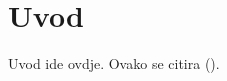 \chapter{Uvod}
\label{sec:structure}
 
Uvod ide ovdje. Ovako se citira (\cite{oetiket2007lshort}).


